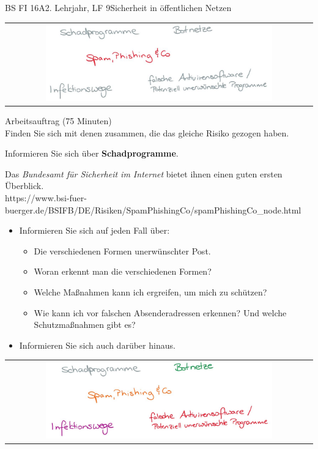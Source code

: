 \documentclass[oneside,openany,headings=optiontotoc,11pt,numbers=noenddot]{scrreprt}
\begin{document}
\begin{worksheet}{BS FI 16A}{2. Lehrjahr, LF 9}{Sicherheit in öffentlichen Netzen}
		\newpage
		\setcounter{page}{1}
		\begin{framed}
			\begin{tabular}{lcr}
				& \includegraphics[width=0.8\textwidth]{Bilder/SpamPhishing.jpg} & \\
			\end{tabular}
		\end{framed}
		\color{codegray}Arbeitsauftrag (75 Minuten)\\
		\color{black}
		Finden Sie sich mit denen zusammen, die das gleiche Risiko gezogen haben.
		\par
		\bigskip
		\noindent
		Informieren Sie sich über \textbf{Schadprogramme}.
		\par\bigskip\noindent
		Das \textit{Bundesamt für Sicherheit im Internet} bietet ihnen einen guten ersten Überblick.\\
		\small{\color{codegray}https://www.bsi-fuer-buerger.de/BSIFB/DE/Risiken/SpamPhishingCo/spamPhishingCo\_node.html}
		\normalsize
		\begin{itemize}
			\item[] Informieren Sie sich auf jeden Fall über:
			\begin{itemize}
				\item[] Die verschiedenen Formen unerwünschter Post.
				\item[] Woran erkennt man die verschiedenen Formen?
				\item[] Welche Maßnahmen kann ich ergreifen, um mich zu schützen?
				\item[] Wie kann ich vor falschen Absenderadressen erkennen? Und welche Schutzmaßnahmen gibt es?
			\end{itemize}
			\item[] Informieren Sie sich auch darüber hinaus.
		\end{itemize}

		\newpage
		\setcounter{page}{1}
		\noindent
		\begin{framed}
			\begin{tabular}{lcr}
				& \includegraphics[width=0.8\textwidth]{Bilder/Gefahren.jpg} &
			\end{tabular}
		\end{framed}
		

\end{worksheet}
\end{document}

